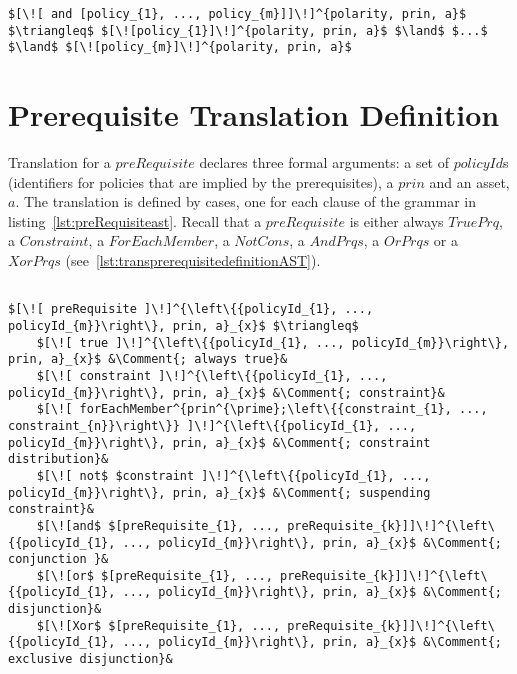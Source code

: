 \lstset{mathescape, language=AST}  
\begin{lstlisting}[frame=single, caption={Policy Translation Definition {$\colon$} AndPolicy},label={lst:transAndpolicyAST}]
$[\![ and [policy_{1}, ..., policy_{m}]]\!]^{polarity, prin, a}$ $\triangleq$ $[\![policy_{1}]\!]^{polarity, prin, a}$ $\land$ $...$ $\land$ $[\![policy_{m}]\!]^{polarity, prin, a}$

\end{lstlisting}




\section{Prerequisite Translation Definition}

Translation for a $preRequisite$ declares three formal arguments: a set of $policyId$s (identifiers for policies that are implied by the prerequisites), a $prin$ and an asset, $a$. The translation is defined by cases, one for each clause of the grammar in listing~\ref{lst:preRequisiteast}. Recall that a $preRequisite$ is either always $TruePrq$, a $Constraint$, a $ForEachMember$, a $NotCons$, a $AndPrqs$, a $OrPrqs$ or a $XorPrqs$ (see~\ref{lst:transprerequisitedefinitionAST}). 

\lstset{mathescape, language=AST}  
\begin{lstlisting}[frame=single, caption={Prerequisite Translation Definition},label={lst:transprerequisitedefinitionAST}]

$[\![ preRequisite ]\!]^{\left\{{policyId_{1}, ..., policyId_{m}}\right\}, prin, a}_{x}$ $\triangleq$
    $[\![ true ]\!]^{\left\{{policyId_{1}, ..., policyId_{m}}\right\}, prin, a}_{x}$ &\Comment{; always true}&
    $[\![ constraint ]\!]^{\left\{{policyId_{1}, ..., policyId_{m}}\right\}, prin, a}_{x}$ &\Comment{; constraint}&      
    $[\![ forEachMember^{prin^{\prime};\left\{{constraint_{1}, ..., constraint_{n}}\right\}} ]\!]^{\left\{{policyId_{1}, ..., policyId_{m}}\right\}, prin, a}_{x}$ &\Comment{; constraint distribution}&
    $[\![ not$ $constraint ]\!]^{\left\{{policyId_{1}, ..., policyId_{m}}\right\}, prin, a}_{x}$ &\Comment{; suspending constraint}&
    $[\![and$ $[preRequisite_{1}, ..., preRequisite_{k}]]\!]^{\left\{{policyId_{1}, ..., policyId_{m}}\right\}, prin, a}_{x}$ &\Comment{; conjunction }&
    $[\![or$ $[preRequisite_{1}, ..., preRequisite_{k}]]\!]^{\left\{{policyId_{1}, ..., policyId_{m}}\right\}, prin, a}_{x}$ &\Comment{; disjunction}&
    $[\![Xor$ $[preRequisite_{1}, ..., preRequisite_{k}]]\!]^{\left\{{policyId_{1}, ..., policyId_{m}}\right\}, prin, a}_{x}$ &\Comment{; exclusive disjunction}&

\end{lstlisting}

